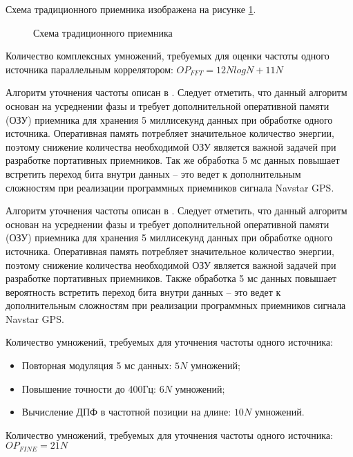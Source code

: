 Схема традиционного приемника изображена на рисунке \ref{pic:corr_scheme}.
\begin{figure}[H]
	\center{}
	\caption{Схема традиционного приемника}
	\label{pic:corr_scheme}
\end{figure}

Количество комплексных умножений, требуемых для оценки частоты одного источника параллельным коррелятором: ${OP_{FFT} = 12NlogN + 11N}$

Алгоритм уточнения частоты описан в \cite{tsui}. Следует отметить, что данный алгоритм основан на усреднении фазы и требует дополнительной
оперативной памяти (ОЗУ) приемника для хранения 5 миллисекунд данных при обработке одного источника. Оперативная память потребляет значительное количество энергии,
поэтому снижение количества необходимой ОЗУ является важной задачей при разработке портативных приемников.
Так же обработка 5 мс данных повышает встретить переход бита внутри данных – это ведет к дополнительным сложностям при реализации программных
приемников сигнала Navstar GPS.

Алгоритм уточнения частоты описан в \cite{tsui}. Следует отметить, что данный алгоритм основан на усреднении фазы и требует дополнительной
оперативной памяти (ОЗУ) приемника для хранения 5 миллисекунд данных при обработке одного источника. Оперативная память потребляет значительное количество
энергии, поэтому снижение количества необходимой ОЗУ является важной задачей при разработке портативных приемников. Также обработка 5 мс данных повышает
вероятность встретить переход бита внутри данных – это ведет к дополнительным сложностям при реализации программных приемников сигнала Navstar GPS.

Количество умножений, требуемых для уточнения частоты одного источника:
\begin{itemize}
	\item Повторная модуляция 5 мс данных: ${5N}$ умножений;
	\item Повышение точности до 400Гц: ${6N}$ умножений;
	\item Вычисление ДПФ в частотной позиции на длине: ${10N}$ умножений.
\end{itemize}

Количество умножений, требуемых для уточнения частоты одного источника: ${OP_{FINE} = 21N}$

\newpage
